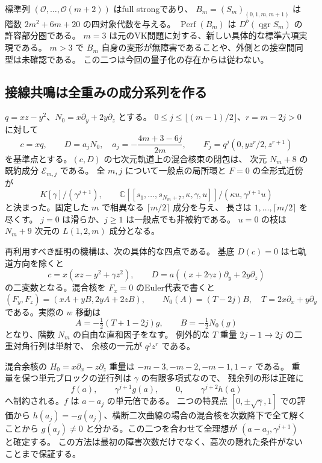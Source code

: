 標準列 $(\mathcal O,\ldots,\mathcal O(m+2))$ はfull strongであり、
$B_m=(S_m)_{(0,1,m,m+1)}$ は階数 $2m^2+6m+20$ の四対象代数を与える。
$\operatorname{Perf}(B_m)$ は $D^b(\operatorname{qgr}S_m)$ の許容部分圏である。
$m=3$ は元のVK問題に対する、新しい具体的な標準六項実現である。
$m>3$ で $B_m$ 自身の変形が無障害であることや、外側との接空間同型は未確認である。
この二つは今回の量子化の存在からは従わない。

\subsection{接線共鳴は全重みの成分系列を作る}

$q=xz-y^2$、$N_0=x\partial_y+2y\partial_z$ とする。
$0\le j\le\lfloor(m-1)/2\rfloor$、$r=m-2j>0$ に対して
\[
 c=xq,\qquad D=a_jN_0,\quad a_j=-\frac{4m+3-6j}{2m},\qquad
 F_j=q^j(0,yz^r/2,z^{r+1})
\]
を基準点とする。$(c,D)$ の七次元軌道上の混合核束の閉包は、
次元 $N_m+8$ の既約成分 $\mathscr E_{m,j}$ である。
全 $m,j$ について一般点の局所環と $F=0$ の全形式近傍が
\[
 K[\gamma]/(\gamma^{j+1}),\qquad
 \mathbb C[[s_1,\ldots,s_{N_m+7},\kappa,\gamma,u]]/
                    (\kappa u,\gamma^{j+1}u)
\]
と決まった。固定した $m$ で相異なる $\lceil m/2\rceil$ 成分を与え、
長さは $1,\ldots,\lceil m/2\rceil$ を尽くす。
$j=0$ は滑らか、$j\ge1$ は一般点でも非被約である。
$u=0$ の枝は $N_m+9$ 次元の $L(1,2,m)$ 成分となる。

再利用すべき証明の機構は、次の具体的な四点である。
基底 $D(c)=0$ は七軌道方向を除くと
\[
 c=x(xz-y^2+\gamma z^2),\qquad
 D=a((x+2\gamma z)\partial_y+2y\partial_z)
\]
の二変数となる。混合核を $F_x=0$ のEuler代表で書くと
\[
 (F_y,F_z)=(xA+yB,2yA+2zB),\qquad
 N_0(A)=(T-2j)B,\quad T=2x\partial_x+y\partial_y
\]
である。実際の $w$ 移動は
\[
 A=-\tfrac12(T+1-2j)g,\qquad B=-\tfrac12N_0(g)
\]
となり、階数 $N_m$ の自由な直和因子をなす。
例外的な $T$ 重量 $2j-1\to2j$ の二重対角行列は単射で、
余核の一元が $q^jz^r$ である。

混合余核の $H_0=x\partial_x-z\partial_z$ 重量は
$-m-3,-m-2,-m-1,1-r$ である。
重量を保つ単元ブロックの逆行列は $\gamma$ の有限多項式なので、
残余列の形は正確に
\[
 f(a),\qquad \gamma^{j+1}g(a),\qquad0,\qquad\gamma^{j+2}h(a)
\]
へ制約される。$f$ は $a-a_j$ の単元倍である。
二つの特異点 $[0,\pm\sqrt\gamma,1]$ での評価から
$h(a_j)=-g(a_j)$、横断二次曲線の場合の混合核を次数降下で全て解くことから
$g(a_j)\ne0$ と分かる。この二つを合わせて全理想が
$(a-a_j,\gamma^{j+1})$ と確定する。
この方法は最初の障害次数だけでなく、高次の隠れた条件がないことまで保証する。

